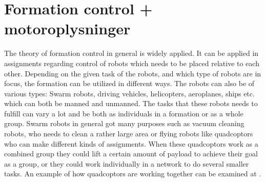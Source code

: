 \section{Formation control + motoroplysninger}
%
The theory of formation control in general is widely applied. It can be applied in assignments regarding control of robots which needs to be placed relative to each other. Depending on the given task of the robots, and which type of robots are in focus, the formation can be utilized in different ways. The robots can also be of various types: Swarm robots, driving vehicles, helicopters, aeroplanes, ships etc. which can both be manned and unmanned. The tasks that these robots needs to fulfill can vary a lot and be both as individuals in a formation or as a whole group. Swarm robots in general got many purposes such as vacuum cleaning robots, who needs to clean a rather large area or flying robots like quadcoptors who can make different kinds of assignments. When these quadcoptors work as a combined group they could lift a certain amount of payload to achieve their goal as a group, or they could work individually in a network to do several smaller tasks. An example of how quadcoptors are working together can be examined at \citep{ethswarm}.

